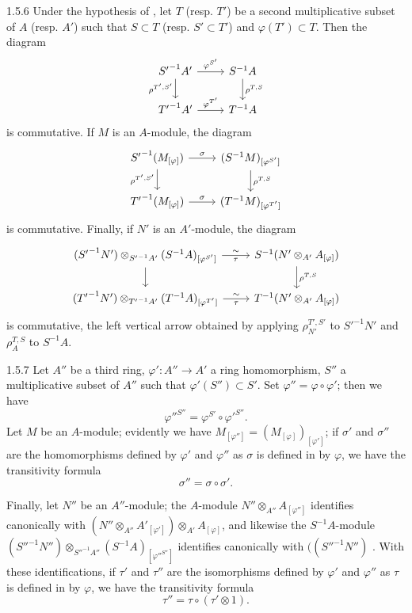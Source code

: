 \documentclass[../main.tex]{subfiles}
\begin{document}
\begin{env}{1.5.6}
Under the hypothesis of , let $T$ (resp. $T'$) be a second multiplicative subset of $A$
(resp. $A'$) such that $S\subset T$ (resp. $S'\subset T'$) and $\varphi(T')\subset T$. Then the diagram
\[
  \begin{tikzcd}
    {S'}^{-1}A'\ar[r,"\varphi^{S'}"]\ar[d,"\rho^{T',S'}"'] & S^{-1}A\ar[d,"\rho^{T,S}"]\\
    {T'}^{-1}A'\ar[r,"\varphi^{T'}"] & T^{-1}A
  \end{tikzcd}
\]
is commutative. If $M$ is an $A$-module, the diagram
\[
  \begin{tikzcd}
    {S'}^{-1}(M_{[\varphi]})\ar[r,"\sigma"]\ar[d,"\rho^{T',S'}"'] &
    (S^{-1}M)_{[\varphi^{S'}]}\ar[d,"\rho^{T,S}"]\\
    {T'}^{-1}(M_{[\varphi]})\ar[r,"\sigma"] & (T^{-1}M)_{[\varphi^{T'}]}
  \end{tikzcd}
\]
is commutative. Finally, if $N'$ is an $A'$-module, the diagram
\[
  \begin{tikzcd}
    ({S'}^{-1}N')\otimes_{{S'}^{-1}A'}(S^{-1}A)_{[\varphi^{S'}]}\ar[r,"\sim","\tau"'] \ar[d] &
    S^{-1}(N'\otimes_{A'}A_{[\varphi]})\ar[d,"\rho^{T,S}"]\\
    ({T'}^{-1}N')\otimes_{{T'}^{-1}A'}(T^{-1}A)_{[\varphi^{T'}]}
    \ar[r,"\sim","\tau"'] & T^{-1}(N'\otimes_{A'}A_{[\varphi]})
  \end{tikzcd}
\]
is commutative, the left vertical arrow obtained by applying
$\rho_{N'}^{T',S'}$ to ${S'}^{-1}N'$ and $\rho_A^{T,S}$ to $S^{-1}A$.
\end{env}

\begin{env}{1.5.7}
Let $A''$ be a third ring, $\varphi'\colon A''\to A'$ a ring homomorphism,
$S''$ a multiplicative subset of $A''$ such that $\varphi'(S'')\subset S'$. Set
$\varphi''=\varphi\circ\varphi'$; then we have
\[
  {\varphi''}^{S''}=\varphi^{S'}\circ{\varphi'}^{S''}.
\]
Let $M$ be an $A$-module; evidently we have $M_{[\varphi'']}=(M_{[\varphi]})_{[\varphi']}$;
if $\sigma'$ and $\sigma''$ are the homomorphisms defined by $\varphi'$ and $\varphi''$ as
$\sigma$ is defined in  by $\varphi$, we have the transitivity formula
\[
  \sigma''=\sigma\circ\sigma'.
\]

Finally, let $N''$ be an $A''$-module; the $A$-module $N''\otimes_{A''}A_{[\varphi'']}$
identifies canonically with
$(N''\otimes_{A''}{A'}_{[\varphi']})\otimes_{A'}A_{[\varphi]}$,
and likewise the $S^{-1}A$-module
${({S''}^{-1}N'')\otimes_{{S''}^{-1}A''}(S^{-1}A)_{[{\varphi''}^{S''}]}}$ identifies
canonically with
$(({S''}^{-1}N'')$ . With these identifications, if $\tau'$
and $\tau''$ are the isomorphisms defined by $\varphi'$ and $\varphi''$ as $\tau$ is defined
in  by $\varphi$, we have the transitivity formula
\[
  \tau''=\tau\circ(\tau'\otimes 1).
\]
\end{env}
\end{document}
